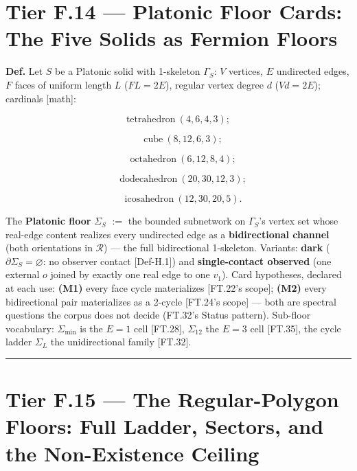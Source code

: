 \section[Tier F.14 — Platonic Floor Cards: The Five Solids as…]{\texorpdfstring{Tier F.14 — Platonic Floor Cards: The Five Solids as Fermion Floors}{Tier F.14 - Platonic Floor Cards: The Five Solids as Fermion Floors}}

\begin{definition}\label{tag:Def-H-20}
\textbf{Def.} Let $S$ be a Platonic solid with 1-skeleton $\Gamma_S$: $V$ vertices, $E$ undirected edges, $F$ faces of uniform length $L$ ($FL=2E$), regular vertex degree $d$ ($Vd=2E$); cardinals [math]:

\[
\text{tetrahedron}\ (4,6,4,3);
\]

\[
\quad\text{cube}\ (8,12,6,3);
\]

\[
\quad\text{octahedron}\ (6,12,8,4);
\]

\[
\quad\text{dodecahedron}\ (20,30,12,3);
\]

\[
\quad\text{icosahedron}\ (12,30,20,5).
\]

The \textbf{Platonic floor} $\Sigma_S$ $:=$ the bounded subnetwork on $\Gamma_S$'s vertex set whose real-edge content realizes every undirected edge as a \textbf{bidirectional channel} (both orientations in $\mathcal R$) — the full bidirectional 1-skeleton. Variants: \textbf{dark} ($\partial\Sigma_S=\varnothing$: no observer contact [Def-H.1]) and \textbf{single-contact observed} (one external $o$ joined by exactly one real edge to one $v_1$). Card hypotheses, declared at each use: \textbf{(M1)} every face cycle materializes [FT.22's scope]; \textbf{(M2)} every bidirectional pair materializes as a 2-cycle [FT.24's scope] — both are spectral questions the corpus does not decide (FT.32's Status pattern). Sub-floor vocabulary: $\Sigma_{\min}$ is the $E{=}1$ cell [FT.28], $\Sigma_{12}$ the $E{=}3$ cell [FT.35], the cycle ladder $\Sigma_L$ the unidirectional family [FT.32].

\vspace{2pt}\noindent\rule{\textwidth}{0.4pt}\vspace{2pt}

\end{definition}

\section[Tier F.15 — The Regular-Polygon Floors: Full Ladder,…]{\texorpdfstring{Tier F.15 — The Regular-Polygon Floors: Full Ladder, Sectors, and the Non-Existence Ceiling}{Tier F.15 - The Regular-Polygon Floors: Full Ladder, Sectors, and the Non-Existence Ceiling}}

